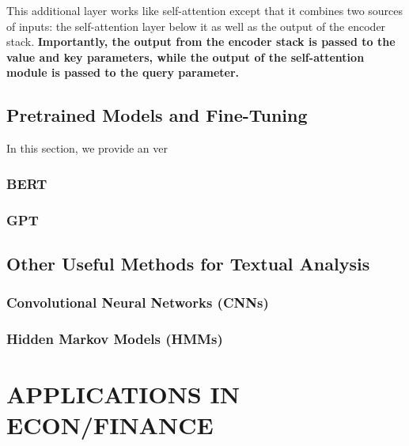 \documentclass[
]{book}
\begin{document}
This additional layer works like self-attention except that it combines two sources of inputs: the self-attention layer below it as well as the output of the encoder stack. \textbf{Importantly, the output from the encoder stack is passed to the value and key parameters, while the output of the self-attention module is passed to the query parameter.}

\hypertarget{pretrained-models-and-fine-tuning}{%
\chapter{Pretrained Models and Fine-Tuning}\label{pretrained-models-and-fine-tuning}}

In this section, we provide an ver

\hypertarget{bert}{%
\section{BERT}\label{bert}}

\hypertarget{gpt}{%
\section{GPT}\label{gpt}}

\hypertarget{other-useful-methods-for-textual-analysis}{%
\chapter{Other Useful Methods for Textual Analysis}\label{other-useful-methods-for-textual-analysis}}

\hypertarget{convolutional-neural-networks-cnns}{%
\section{Convolutional Neural Networks (CNNs)}\label{convolutional-neural-networks-cnns}}

\hypertarget{hidden-markov-models-hmms}{%
\section{Hidden Markov Models (HMMs)}\label{hidden-markov-models-hmms}}

\hypertarget{part-applications-in-econfinance}{%
\part*{APPLICATIONS IN ECON/FINANCE}\label{part-applications-in-econfinance}}
\end{document}

